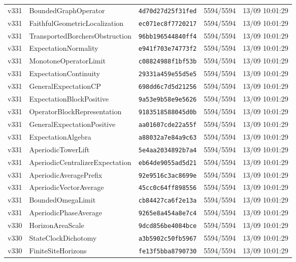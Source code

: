 \documentclass[11pt]{article}
\theoremstyle{definition}\newtheorem{deriv}{Derivação}
\begin{document}
{\begin{longtable}{@{}lllll@{}}
v331 & BoundedGraphOperator & \texttt{4d70d27d25f31fed} & 5594/5594 & 13/09 10:01:29 \\
v331 & FaithfulGeometricLocalization & \texttt{ec071ec8f7720217} & 5594/5594 & 13/09 10:01:29 \\
v331 & TransportedBorchersObstruction & \texttt{96bb196544840ff4} & 5594/5594 & 13/09 10:01:29 \\
v331 & ExpectationNormality & \texttt{e941f703e74773f2} & 5594/5594 & 13/09 10:01:29 \\
v331 & MonotoneOperatorLimit & \texttt{c08824988f1bf53b} & 5594/5594 & 13/09 10:01:29 \\
v331 & ExpectationContinuity & \texttt{29331a459e55d5e5} & 5594/5594 & 13/09 10:01:29 \\
v331 & GeneralExpectationCP & \texttt{698dd6c7d5d21256} & 5594/5594 & 13/09 10:01:29 \\
v331 & ExpectationBlockPositive & \texttt{9a53e9b58e9e5626} & 5594/5594 & 13/09 10:01:29 \\
v331 & OperatorBlockRepresentation & \texttt{9183518588045d0b} & 5594/5594 & 13/09 10:01:29 \\
v331 & GeneralExpectationPositive & \texttt{aa01607cde22a55f} & 5594/5594 & 13/09 10:01:29 \\
v331 & ExpectationAlgebra & \texttt{a88032a7e84a9c63} & 5594/5594 & 13/09 10:01:29 \\
v331 & AperiodicTowerLift & \texttt{5e4aa2034892b7a4} & 5594/5594 & 13/09 10:01:29 \\
v331 & AperiodicCentralizerExpectation & \texttt{eb64de9055ad5d21} & 5594/5594 & 13/09 10:01:29 \\
v331 & AperiodicAveragePrefix & \texttt{92e9516c3ac8699e} & 5594/5594 & 13/09 10:01:29 \\
v331 & AperiodicVectorAverage & \texttt{45cc0c64ff898556} & 5594/5594 & 13/09 10:01:29 \\
v331 & BoundedOmegaLimit & \texttt{cb84427ca6f2e13a} & 5594/5594 & 13/09 10:01:29 \\
v331 & AperiodicPhaseAverage & \texttt{9265e8a454a8e7c4} & 5594/5594 & 13/09 10:01:29 \\
v330 & HorizonAreaScale & \texttt{9dcd856be4084bce} & 5594/5594 & 13/09 10:01:29 \\
v330 & StateClockDichotomy & \texttt{a3b5902c50fb5967} & 5594/5594 & 13/09 10:01:29 \\
v330 & FiniteSiteHorizons & \texttt{fe13f5bba8790730} & 5594/5594 & 13/09 10:01:29 \\

\end{longtable}}
\end{document}
